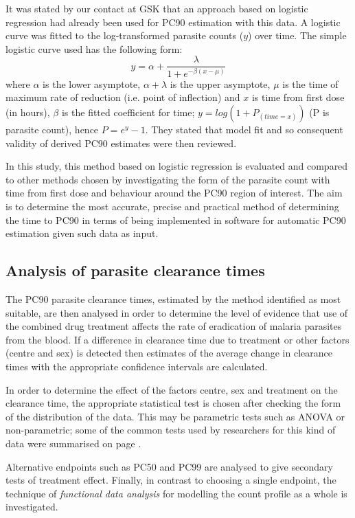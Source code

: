 It was stated by our contact at GSK that an approach based on logistic regression had already been used for PC90 estimation with this data. A logistic curve was fitted to the log-transformed parasite counts ($y$) over time. The simple logistic curve used has the following form: 
$$
y=\alpha+\frac{\lambda}{1+e^{-\beta(x-\mu)}}
$$
where $\alpha$ is the lower asymptote, $\alpha+\lambda$ is the upper asymptote, $\mu$ is the time of maximum rate of reduction (i.e. point of inflection) and $x$ is time from first dose (in hours), $\beta$ is the fitted coefficient for time; $y = log(1 + P_{(time=x)})$ (P is parasite count), hence $P = e^{y}-1$. They stated that model fit and so consequent validity of derived PC90 estimates were then reviewed.

In this study, this method based on logistic regression is evaluated and compared to other methods chosen by investigating the form of the parasite count with time from first dose and behaviour around the PC90 region of interest. The aim is to determine the most accurate, precise and practical method of determining the time to PC90 in terms of being implemented in software for automatic PC90 estimation given such data as input.

\subsection{Analysis of parasite clearance times}
The PC90 parasite clearance times, estimated by the method identified as most suitable, are then analysed in order to determine the level of evidence that use of the combined drug treatment affects the rate of eradication of malaria parasites from the blood. If a difference in clearance time due to treatment or other factors (centre and sex) is detected then estimates of the average change in clearance times with the appropriate confidence intervals are calculated.

In order to determine the effect of the factors centre, sex and treatment on the clearance time, the appropriate statistical test is chosen after checking the form of the distribution of the data. This may be parametric tests such as ANOVA or non-parametric; some of the common tests used by researchers for this kind of data were summarised on page \pageref{stat-tests}.

Alternative endpoints such as PC50 and PC99 are analysed to give secondary tests of treatment effect. Finally, in contrast to choosing a single endpoint, the technique of \emph{functional data analysis} for modelling the count profile as a whole is investigated. 
